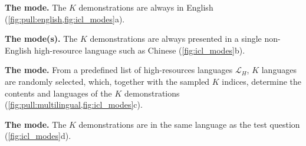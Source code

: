 \vspace{2pt}\noindent\textbf{The \english mode.} The $K$ demonstrations are always in English (\cref{fig:pull:english,fig:icl_modes}a).

\vspace{2pt}\noindent\textbf{The \monolingual mode(s).} The $K$ demonstrations are always presented in a single non-English high-resource language such as Chinese (\cref{fig:icl_modes}b).

\vspace{2pt}\noindent\textbf{The \multilingual mode.} \label{sec:icl:multilingual_mode}
From a predefined list of high-resources languages $\mathcal{L}_H$, $K$ languages are randomly selected, which, together with the sampled $K$ indices, determine the contents and languages of the $K$ demonstrations (\cref{fig:pull:multilingual,fig:icl_modes}c).

\vspace{2pt}\noindent\textbf{The \native mode.} The $K$ demonstrations are in the same language as the test question (\cref{fig:icl_modes}d).
